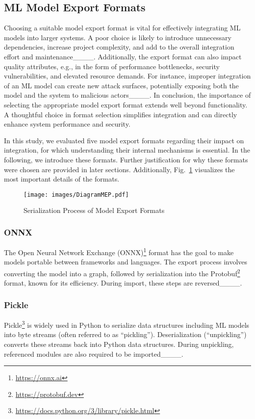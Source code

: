 \subsection{ML Model Export Formats}
Choosing a suitable model export format is vital for effectively integrating ML models into larger systems.
A poor choice is likely to introduce unnecessary dependencies, increase project complexity, and add to the overall integration effort and maintenance____.
Additionally, the export format can also impact quality attributes, e.g., in the form of performance bottlenecks, security vulnerabilities, and elevated resource demands.
For instance, improper integration of an ML model can create new attack surfaces, potentially exposing both the model and the system to malicious actors____.
In conclusion, the importance of selecting the appropriate model export format extends well beyond functionality.
A thoughtful choice in format selection simplifies integration and can directly enhance system performance and security.

In this study, we evaluated five model export formats regarding their impact on integration, for which understanding their internal mechanisms is essential.
In the following, we introduce these formats. Further justification for why these formats were chosen are provided in later sections.
Additionally, Fig.~\ref{fig:export-formats} visualizes the most important details of the formats.

\begin{figure}
    \centering
    \texttt{[image: images/DiagramMEP.pdf]}
    \caption{Serialization Process of Model Export Formats}
    \label{fig:export-formats}
\end{figure}

\subsubsection{ONNX}
The Open Neural Network Exchange (ONNX)\footnote{\url{https://onnx.ai}} format has the goal to make models portable between frameworks and languages.
The export process involves converting the model into a graph, followed by serialization into the Protobuf\footnote{\url{https://protobuf.dev}} format, known for its efficiency.
During import, these steps are reversed____.

\subsubsection{Pickle}
Pickle\footnote{\url{https://docs.python.org/3/library/pickle.html}} is widely used in Python to serialize data structures including ML models into byte streams (often referred to as \enquote{pickling}).
Deserialization (\enquote{unpickling}) converts these streams back into Python data structures.
During unpickling, referenced modules are also required to be imported____.

